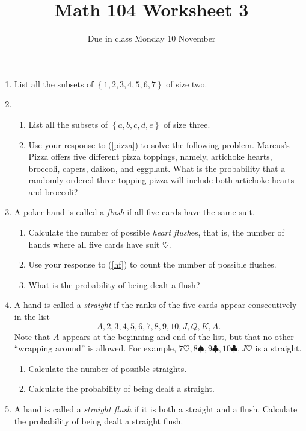 \documentclass[12pt]{article}
\author{}\date{Due in class Monday 10 November}
\title{Math 104 Worksheet 3}\author{}
\begin{document}
\maketitle
\pagestyle{empty}
\begin{enumerate}
\item List all the subsets of $\left\{1,2,3,4,5,6,7\right\}$
of size two.
\item\begin{enumerate}
\item\label{pizza}
List all the subsets of $\left\{a,b,c,d,e\right\}$ of size three.
\item Use your response to (\ref{pizza}) to solve the following problem.
Marcus's Pizza offers five different pizza toppings,
namely, artichoke hearts, broccoli, capers, daikon, and eggplant.
What is the probability that a randomly ordered three-topping pizza
will include both artichoke hearts and broccoli?
\end{enumerate}
\item A poker hand is called a {\em flush} if all five cards
have the same suit.
\begin{enumerate}
\item\label{hf} Calculate the number of possible {\em heart flush}es,
that is, the number of hands where all five cards have suit $\heartsuit$.
\item Use your response to (\ref{hf}) to count the number of
possible flushes.
\item What is the probability of being dealt a flush?
\end{enumerate}
\item A hand is called a {\em straight} if the ranks of the five
cards appear consecutively in the list
\[A,2,3,4,5,6,7,8,9,10,J,Q,K,A.\]
Note that $A$ appears at the beginning and end of the list, but
that no other ``wrapping around'' is allowed.
For example, $7\heartsuit,8\spadesuit,9\clubsuit,10\clubsuit,J\heartsuit$
is a straight.
\begin{enumerate}
\item Calculate the number of possible straights.
\item Calculate the probability of being dealt a straight.
\end{enumerate}
\item A hand is called a {\em straight flush} if it is both
a straight and a flush. Calculate the probability of being dealt
a straight flush.
\end{enumerate}
\end{document}
